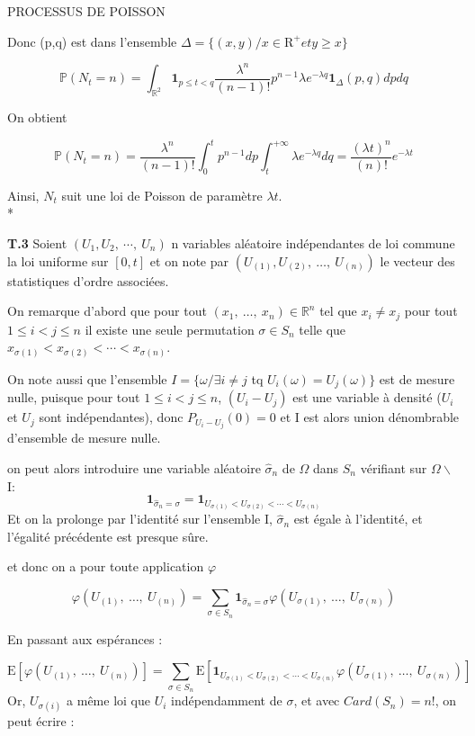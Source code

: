 PROCESSUS DE POISSON\documentclass[a4paper,10pt]{article}
\begin{document}
Donc (p,q) est dans l'ensemble $\Delta=\lbrace{(x,y)/x\in \mathrm{R}^{+} et  y\geqslant x}\rbrace$

$$
\mathbb{P}(N_t=n)=\int_{\mathbb{R}^2}{\textbf{1}_{p\leqslant t < q}}\frac{{\lambda}^n}{(n-1)!}{p^{n-1}}{\lambda}e^{-{\lambda}q}\textbf{1}_{\Delta}(p,q)dpdq
$$

On obtient

$$
\mathbb{P}(N_t=n)= \frac{{\lambda}^n}{(n-1)!}\int_{0}^{t}{p^{n-1}}dp\int_{t}^{+\infty}{\lambda}e^{-{\lambda}q}dq
= \frac{({\lambda}t)^n}{(n)!}e^{-{\lambda}t}
$$

Ainsi, $N_t$ suit une loi de Poisson de param\`{e}tre $\lambda{t}$.\\*


\textbf{T.3}   Soient $(U_{1},U_{2},\ \cdots,\ U_{n})$ n variables al\'{e}atoire ind\'{e}pendantes de loi commune la loi uniforme sur $[0,t]$ et on note par $(U_{(1)},U_{(2)},\ \ldots,\ U_{(n)})$  le vecteur des statistiques d'ordre associ\'{e}es.

On remarque d'abord que pour tout $(x_{1},\ \ldots,\ x_{n})\in \mathbb{R}^{n}$ tel que $x_{i}\neq x_{j}$ pour tout $1\leq i<j\leq n$ il existe une seule permutation $\sigma\in S_{n}$ telle que $x_{\sigma(1)}<x_{\sigma(2)}<\cdots<x_{\sigma(n)}$.

On note aussi que l'ensemble $I=\lbrace \omega  \slash \exists i\neq j$ tq $ U_i(\omega)=U_j(\omega)\rbrace$ est de mesure nulle, puisque pour tout $1\leq i<j\leq n$,  $(U_i-U_j)$ est une variable à densité ($U_i$ et $U_j$ sont indépendantes), donc $P_{U_i-U_j}(0)=0$ et I est alors union dénombrable d'ensemble de mesure nulle.

 on peut alors introduire une variable al\'{e}atoire $\hat{\sigma}_n$ de $\Omega$ dans $S_n$ vérifiant sur $\Omega\backslash $I: 
$$
\textbf{1}_{\hat{\sigma}_n=\sigma}=\textbf{1}_{U_{\sigma(1)}< U_{\sigma(2)}<\cdots<U_{\sigma(n)}}
$$
Et on la prolonge  par l'identité sur l'ensemble I, $\hat{\sigma}_n$ est égale à l'identité, et l'égalité précédente est presque s\^ure.

et donc on a pour toute application $\varphi$

$$
\varphi(U_{(1)},\ \ldots,\ U_{(n)})=\sum_{\sigma\in S_{n}}\textbf{1}_{\hat{\sigma}_n=\sigma}\varphi(U_{\sigma(1)},\ \ldots,\ U_{\sigma(n)})
$$

En passant aux espérances : 

$$
\mathrm{E}[\varphi(U_{(1)},\ \ldots,\ U_{(n)})]=\sum_{\sigma\in S_{n}}\mathrm{E}[\textbf{1}_{U_{\sigma(1)}< U_{\sigma(2)}<\cdots<U_{\sigma(n)}}\varphi(U_{\sigma(1)},\ \ldots,\ U_{\sigma(n)})]
$$
Or, $U_{\sigma(i)}$ a m\^eme loi que $U_i$ indépendamment de $\sigma$, et avec $Card(S_n)=n!$, on peut écrire :
\end{document}
